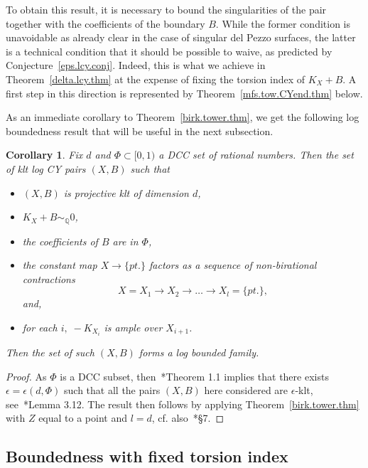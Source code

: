 \documentclass[11pt]{ip-journal}
\newtheorem{corollary}[theorem]{Corollary}
\theoremstyle{definition}
\begin{document}
To obtain this result, it is necessary to bound the singularities of the pair together with the coefficients of the boundary $B$.
While the former condition is unavoidable as already clear in the case of singular del Pezzo surfaces, the latter is a technical condition that it should be possible to waive, as predicted by Conjecture~\ref{eps.lcy.conj}.
Indeed, this is what we achieve in Theorem~\ref{delta.lcy.thm} at the expense of fixing the torsion index of $K_X+B$.
A first step in this direction is represented by Theorem~\ref{mfs.tow.CYend.thm} below.

As an immediate corollary to Theorem~\ref{birk.tower.thm}, we get the following log boundedness result that will be useful in the next subsection.

\begin{corollary}\label{logCY.fibred.cor}
Fix $d$ and $\Phi \subset [0,1)$ a DCC set of rational numbers. 
Then the set of klt log CY pairs $(X, B)$ such that 
\begin{itemize}
    \item $(X, B)$ is projective klt of dimension $d$,
    \item $K_X+B \sim_\mathbb{Q} 0$,
    \item the coefficients of $B$ are in $\Phi$,
    \item the constant map $X \to \{pt. \}$ factors as a sequence of non-birational contractions
    \begin{equation}\label{mfs.tower.pt.eq}
        X = X_1 \to X_2 \to \dots \to X_l = \{pt. \},
    \end{equation}
    and,
    \item for each $i, \; -K_{X_i}$ is ample over $X_{i+1}$.
\end{itemize}
Then the set of such $(X, B)$ forms a log bounded family.
\end{corollary}

\begin{proof}
As $\Phi$ is a DCC subset, then~\cite{MR3224718}*{Theorem 1.1} implies that there exists $\epsilon=\epsilon(d, \Phi)$ such that all the pairs $(X, B)$ here considered are $\epsilon$-klt, see~\cite{CDHJS}*{Lemma 3.12}.
The result then follows by applying Theorem~\ref{birk.tower.thm} with $Z$ equal to a point and $l=d$, cf. also~\cite{1811.10709}*{\S 7}.
\end{proof}

\subsection{Boundedness with fixed torsion index}
\end{document}
